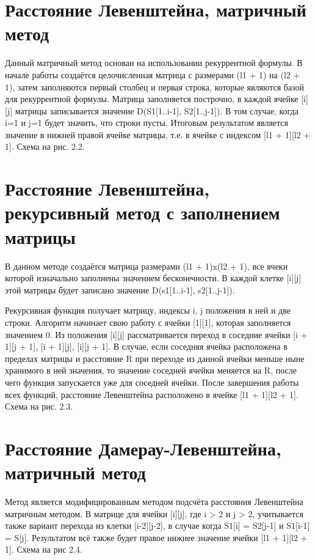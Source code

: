 \documentclass[12pt,a4paper]{report}
\begin{document}
\section{Расстояние Левенштейна, матричный метод}

Данный матричный метод основан на использовании рекуррентной формулы. В начале работы создаётся 
целочисленная матрица с размерами (l1 + 1) на (l2 + 1), затем заполняются первый столбец и первая 
строка, которые являются базой для рекуррентной формулы. Матрица заполняется построчно, в каждой 
ячейке [i][j] матрицы записывается значение D(S1[1..i-1], S2[1..j-1]). В том случае, когда i=1 и 
j=1 будет значить, что строки пусты. Итоговым результатом является значение в нижней правой ячейке
 матрицы, т.е. в ячейке с индексом [l1 + 1][l2 + 1]. Схема на рис. 2.2.

\section{Расстояние Левенштейна, рекурсивный метод с заполнением матрицы}

В данном методе создаётся матрица размерами (l1 + 1)x(l2 + 1), все ячеки которой изначально заполнены 
значением бесконечности. В каждой клетке [i][j] этой матрицы будет записано значение D(s1[1..i-1], s2[1..j-1]).

Рекурсивная функция получает матрицу, индексы i, j положения в ней и две строки. Алгоритм начинает свою 
работу с ячейки [1][1], которая заполняется значением 0. Из положения [i][j] рассматривается переход в 
соседние ячейки [i + 1][j + 1], [i + 1][j], [i][j + 1]. В случае, если соседняя ячейка расположена в 
пределах матрицы и расстояние R при переходе из данной ячейки меньше ныне хранимого в ней значения, то 
значение соседней ячейки меняется на R, после чего функция запускается уже для соседней ячейки. После 
завершения работы всех функций, расстояние Левенштейна расположено в ячейке [l1 + 1][l2 + 1]. Схема на
рис. 2.3.

\section{Расстояние Дамерау-Левенштейна, матричный метод}

Метод является модифицированным методом подсчёта расстояния Левенштейна матричным методом. В матрице
для ячейки [i][j], где i > 2 и j > 2, учитывается также вариант перехода из клетки [i-2][j-2], в 
случае когда S1[i] = S2[j-1] и S1[i-1] = S[j]. Результатом всё также будет правое нижнее значение
ячейки [l1 + 1][l2 + 1]. Схема на рис 2.4.
\end{document}
